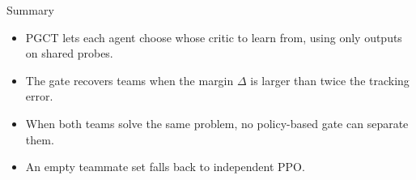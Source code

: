 \documentclass{beamer}
\begin{document}
\begin{frame}{Summary}
  \begin{itemize}
    \item PGCT lets each agent choose whose critic to learn from, using only outputs on shared probes.
    \item The gate recovers teams when the margin $\Delta$ is larger than twice the tracking error.
    \item When both teams solve the same problem, no policy-based gate can separate them.
    \item An empty teammate set falls back to independent PPO.
  \end{itemize}
\end{frame}
\end{document}
